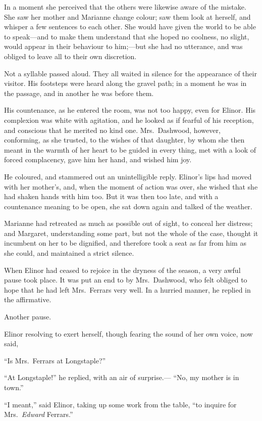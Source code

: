 In a moment she perceived that the others were likewise
aware of the mistake.  She saw her mother and Marianne
change colour; saw them look at herself, and whisper
a few sentences to each other.  She would have given
the world to be able to speak---and to make them understand
that she hoped no coolness, no slight, would appear
in their behaviour to him;---but she had no utterance,
and was obliged to leave all to their own discretion.

Not a syllable passed aloud.  They all waited
in silence for the appearance of their visitor.
His footsteps were heard along the gravel path; in a moment
he was in the passage, and in another he was before them.

His countenance, as he entered the room, was not
too happy, even for Elinor.  His complexion was white
with agitation, and he looked as if fearful of his
reception, and conscious that he merited no kind one.
Mrs.\ Dashwood, however, conforming, as she trusted,
to the wishes of that daughter, by whom she then meant
in the warmth of her heart to be guided in every thing,
met with a look of forced complacency, gave him her hand,
and wished him joy.

He coloured, and stammered out an unintelligible reply.
Elinor's lips had moved with her mother's, and, when the
moment of action was over, she wished that she had shaken
hands with him too.  But it was then too late, and with a
countenance meaning to be open, she sat down again
and talked of the weather.

Marianne had retreated as much as possible
out of sight, to conceal her distress; and Margaret,
understanding some part, but not the whole of the case,
thought it incumbent on her to be dignified, and therefore
took a seat as far from him as she could, and maintained
a strict silence.

When Elinor had ceased to rejoice in the dryness
of the season, a very awful pause took place.  It was put
an end to by Mrs.\ Dashwood, who felt obliged to hope that he
had left Mrs.\ Ferrars very well.  In a hurried manner,
he replied in the affirmative.

Another pause.

Elinor resolving to exert herself, though fearing
the sound of her own voice, now said,

``Is Mrs.\ Ferrars at Longstaple?''

``At Longstaple!'' he replied, with an air of surprise.---%
``No, my mother is in town.''

``I meant,'' said Elinor, taking up some work from
the table, ``to inquire for Mrs.\ \emph{Edward} Ferrars.''

